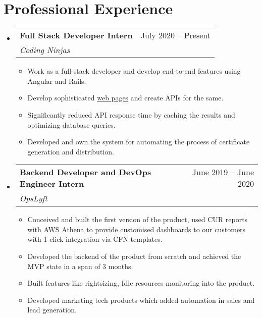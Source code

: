 \documentclass[letterpaper,11pt]{article}
\makeatletter
\newcommand{\resumeItem}[1]{
  \item\small{
    {#1 \vspace{-2pt}}
  }
}
\newcommand{\resumeSubheading}[4]{
  \vspace{-2pt}\item
    \begin{tabular*}{0.97\textwidth}[t]{l@{\extracolsep{\fill}}r}
      \textbf{#1} & #2 \\
      \textit{\small#3} & \textit{\small #4} \\
    \end{tabular*}\vspace{-7pt}
}
\newcommand{\resumeSubSubheading}[2]{
    \item
    \begin{tabular*}{0.97\textwidth}{l@{\extracolsep{\fill}}r}
      \textit{\small#1} & \textit{\small #2} \\
    \end{tabular*}\vspace{-7pt}
}
\newcommand{\resumeSubHeadingListStart}{\begin{itemize}[leftmargin=0.15in, label={}]}
\newcommand{\resumeSubHeadingListEnd}{\end{itemize}}
\newcommand{\resumeItemListStart}{\begin{itemize}}
\newcommand{\resumeItemListEnd}{\end{itemize}\vspace{-5pt}}
\makeatother
\begin{document}
\section{Professional Experience}
  \resumeSubHeadingListStart

    \resumeSubheading
      {Full Stack Developer Intern}{July 2020 -- Present}
      {Coding Ninjas}{}
      \resumeItemListStart
        \resumeItem{Work as a full-stack developer and develop end-to-end features using Angular and Rails.}
        \resumeItem{Develop sophisticated \href{https://www.codingninjas.com/courses/premium-foundation-course}{web pages} and create APIs for the same.}
        \resumeItem{Significantly reduced API response time by caching the results and optimizing database queries.}
        \resumeItem{Developed and own the system for automating the process of certificate generation and distribution.}
      \resumeItemListEnd
      

    \resumeSubheading
      {Backend Developer and DevOps Engineer Intern}{June 2019 -- June 2020}
      {OpsLyft}{}
      \resumeItemListStart
        \resumeItem{Conceived and built the first version of the product, used CUR reports with AWS Athena to provide customised dashboards to our customers with 1-click integration via CFN templates.}
        \resumeItem{Developed the backend of the product from scratch and achieved the MVP state in a span of 3 months.}
        \resumeItem{Built features like rightsizing, Idle resources monitoring into the product.}
        \resumeItem{Developed marketing tech products which added automation in sales and lead generation.}
    \resumeItemListEnd
  \resumeSubHeadingListEnd


\end{document}
